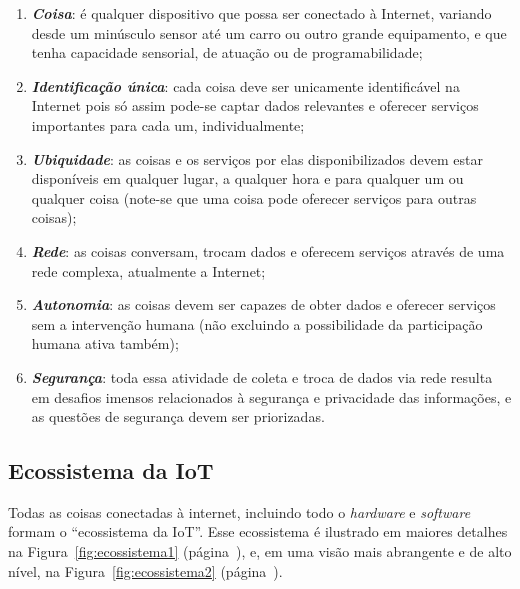 \documentclass[pdftex, brazil, 12pt, twoside]{article}
\newcommand{\ingles}[1]{\textit{#1}}
\begin{document}
\begin{enumerate}
\item \emph{\textbf{Coisa}}: é qualquer dispositivo que possa ser conectado
  à Internet, variando desde um minúsculo sensor até um carro ou outro
  grande equipamento, e que tenha capacidade sensorial, de atuação ou de
  programabilidade;
\item \emph{\textbf{Identificação única}}: cada coisa deve ser unicamente
  identificável na Internet pois só assim pode-se captar dados relevantes
  e oferecer serviços importantes para cada um, individualmente;
\item \emph{\textbf{Ubiquidade}}: as coisas e os serviços por elas disponibilizados
  devem estar disponíveis em qualquer lugar, a qualquer hora e para qualquer um
  ou qualquer coisa (note-se que uma coisa pode oferecer serviços para outras
  coisas);
\item \emph{\textbf{Rede}}: as coisas conversam, trocam dados e oferecem
  serviços através de uma rede complexa, atualmente a Internet;
\item \emph{\textbf{Autonomia}}: as coisas devem ser capazes de
  obter dados e oferecer serviços sem a intervenção humana (não excluindo
  a possibilidade da participação humana ativa também);
\item \emph{\textbf{Segurança}}: toda essa atividade de coleta e troca de
  dados via rede resulta em desafios imensos relacionados à segurança e
  privacidade das informações, e as questões de segurança devem ser
  priorizadas.
\end{enumerate}


\subsection{Ecossistema da IoT}
\label{o-que-e-iot-ecossistema}

Todas as coisas conectadas à internet, incluindo todo o \ingles{hardware}
e \ingles{software} formam o ``ecossistema da IoT''. Esse ecossistema é ilustrado em maiores
detalhes na Figura~\ref{fig:ecossistema1} (página~\pageref{fig:ecossistema1}),
e, em uma visão mais abrangente e de alto nível, na Figura~\ref{fig:ecossistema2}
(página~\pageref{fig:ecossistema2}).
\end{document}
